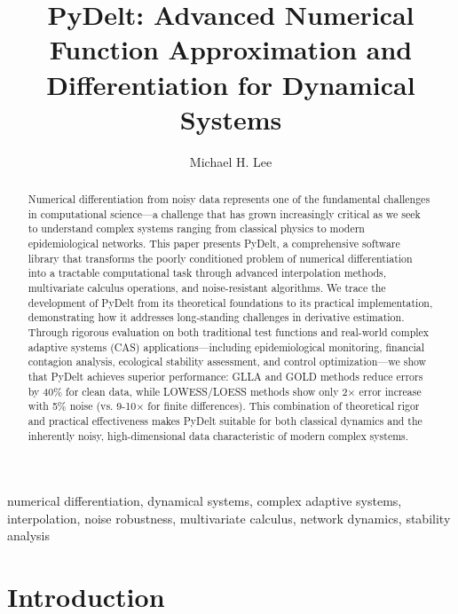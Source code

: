 \documentclass[10pt,journal,compsoc]{IEEEtran}
\begin{document}
\title{PyDelt: Advanced Numerical Function Approximation and Differentiation for Dynamical Systems}

\author{Michael H. Lee}


\maketitle

\begin{abstract}
Numerical differentiation from noisy data represents one of the fundamental challenges in computational science---a challenge that has grown increasingly critical as we seek to understand complex systems ranging from classical physics to modern epidemiological networks. This paper presents PyDelt, a comprehensive software library that transforms the poorly conditioned problem of numerical differentiation into a tractable computational task through advanced interpolation methods, multivariate calculus operations, and noise-resistant algorithms. We trace the development of PyDelt from its theoretical foundations to its practical implementation, demonstrating how it addresses long-standing challenges in derivative estimation. Through rigorous evaluation on both traditional test functions and real-world complex adaptive systems (CAS) applications---including epidemiological monitoring, financial contagion analysis, ecological stability assessment, and control optimization---we show that PyDelt achieves superior performance: GLLA and GOLD methods reduce errors by 40\% for clean data, while LOWESS/LOESS methods show only 2× error increase with 5\% noise (vs. 9-10× for finite differences). This combination of theoretical rigor and practical effectiveness makes PyDelt suitable for both classical dynamics and the inherently noisy, high-dimensional data characteristic of modern complex systems.
\end{abstract}

\begin{IEEEkeywords}
numerical differentiation, dynamical systems, complex adaptive systems, interpolation, noise robustness, multivariate calculus, network dynamics, stability analysis
\end{IEEEkeywords}

\section{Introduction}
\end{document}
